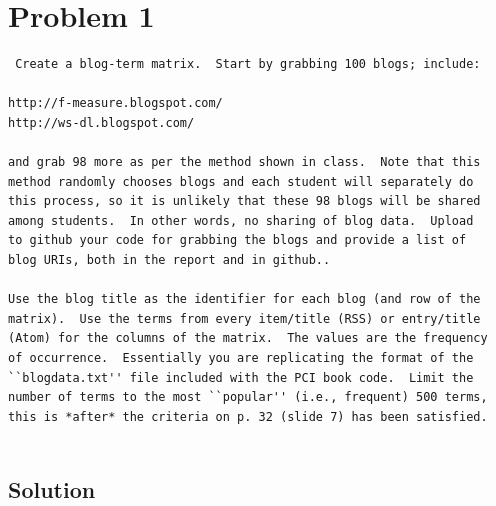  
\section{Problem 1}
\label{part1}
\begin{verbatim}
 Create a blog-term matrix.  Start by grabbing 100 blogs; include:

http://f-measure.blogspot.com/
http://ws-dl.blogspot.com/

and grab 98 more as per the method shown in class.  Note that this
method randomly chooses blogs and each student will separately do
this process, so it is unlikely that these 98 blogs will be shared
among students.  In other words, no sharing of blog data.  Upload
to github your code for grabbing the blogs and provide a list of
blog URIs, both in the report and in github..

Use the blog title as the identifier for each blog (and row of the
matrix).  Use the terms from every item/title (RSS) or entry/title
(Atom) for the columns of the matrix.  The values are the frequency
of occurrence.  Essentially you are replicating the format of the
``blogdata.txt'' file included with the PCI book code.  Limit the
number of terms to the most ``popular'' (i.e., frequent) 500 terms,
this is *after* the criteria on p. 32 (slide 7) has been satisfied.
 
\end{verbatim}

\subsection{Solution}

